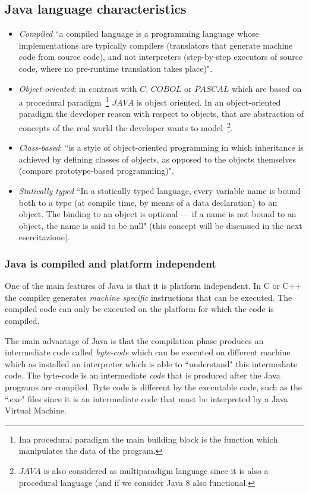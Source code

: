 \documentclass{article}
\theoremstyle{definition}
\begin{document}
\subsection{Java language characteristics}
\begin{itemize}
\item \emph{Compiled} ``a compiled language is a programming language whose implementations are typically compilers (translators that generate machine code from source code), and not interpreters (step-by-step executors of source code, where no pre-runtime translation takes place)"\cite{WikipediaCompiled}.
\item \emph{Object-oriented}: in contrast with $C$, $COBOL$ or $PASCAL$ which are based on a procedural paradigm~\footnote{Ina procedural paradigm the main building block is the function which manipulates the data of the program.} $JAVA$ is object oriented. In an object-oriented paradigm the developer reason with respect to objects, that are abstraction of concepts of the real world the developer wants to model~\footnote{$JAVA$ is also considered as multiparadigm language since it is also a procedural language (and if we consider Java 8 also functional.}.
\item \emph{Class-based}: ``is a style of object-oriented programming in which inheritance is achieved by defining classes of objects, as opposed to the objects themselves (compare prototype-based programming)"\cite{Wikipedia}.
\item \emph{Statically typed} ``In a statically typed language, every variable name is bound both
to a type (at compile time, by means of a data declaration) to an object.
The binding to an object is optional — if a name is not bound to an object, the name is said to be null"\cite{StaticallyTyped} (this concept will be discussed in the next esercitazione).
\end{itemize}

\subsubsection{Java is compiled and platform independent}
One of the main features of Java is that it is platform independent. In C or C++ the compiler generates \emph{machine specific} instructions that can be executed. The compiled code can only be executed on the platform for which the code is compiled.

The main advantage of Java is that the compilation phase produces an intermediate code called \emph{byte-code} which can be executed on different machine which as installed an interpreter which is able to ``understand" this intermediate code.
The byte-code is an intermediate \emph{code} that is produced after the Java programs are compiled.  Byte code is different by the executable code, such as the ``.exe" files since it is an intermediate code that must be interpreted by a Java Virtual Machine.
\end{document}

